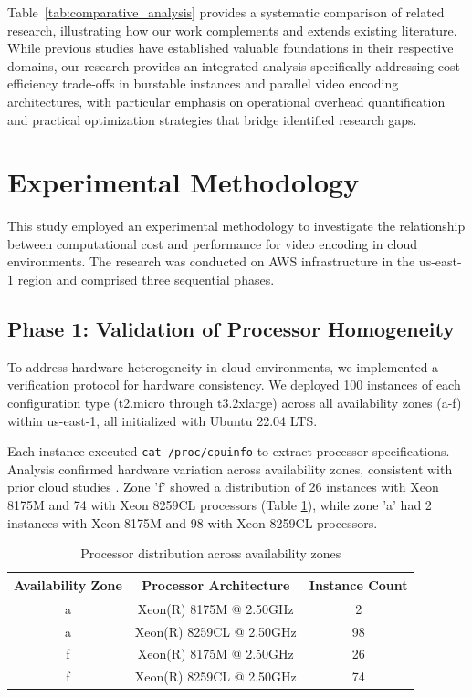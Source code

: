 \documentclass[conference]{IEEEtran}
\begin{document}
	Table~\ref{tab:comparative_analysis} provides a systematic comparison of related research, illustrating how our work complements and extends existing literature. While previous studies have established valuable foundations in their respective domains, our research provides an integrated analysis specifically addressing cost-efficiency trade-offs in burstable instances and parallel video encoding architectures, with particular emphasis on operational overhead quantification and practical optimization strategies that bridge identified research gaps.
	
	\section{Experimental Methodology}
	\label{met}
	
	This study employed an experimental methodology to investigate the relationship between computational cost and performance for video encoding in cloud environments. The research was conducted on AWS infrastructure in the us-east-1 region and comprised three sequential phases.
	
	\subsection{Phase 1: Validation of Processor Homogeneity}
	\label{met:validation-processor-homogeneity}
	
	To address hardware heterogeneity in cloud environments, we implemented a verification protocol for hardware consistency. We deployed 100 instances of each configuration type (t2.micro through t3.2xlarge) across all availability zones (a-f) within us-east-1, all initialized with Ubuntu 22.04 LTS.
	
	Each instance executed \texttt{cat /proc/cpuinfo} to extract processor specifications. Analysis confirmed hardware variation across availability zones, consistent with prior cloud studies \cite{b2, b5, b6, b7}. Zone 'f' showed a distribution of 26 instances with Xeon 8175M and 74 with Xeon 8259CL processors (Table \ref{tab:processors}), while zone 'a' had 2 instances with Xeon 8175M and 98 with Xeon 8259CL processors.
	
	\begin{table}[htbp]
		\centering
		\caption{Processor distribution across availability zones}
		\label{tab:processors}
		\begin{tabular}{|c|c|c|}
			\hline
			Availability Zone & Processor Architecture & Instance Count \\ \hline
			a & Xeon(R) 8175M @ 2.50GHz & 2 \\ \hline
			a & Xeon(R) 8259CL @ 2.50GHz & 98 \\ \hline
			f & Xeon(R) 8175M @ 2.50GHz & 26 \\ \hline
			f & Xeon(R) 8259CL @ 2.50GHz & 74 \\ \hline
		\end{tabular}
	\end{table}
	
\end{document}
